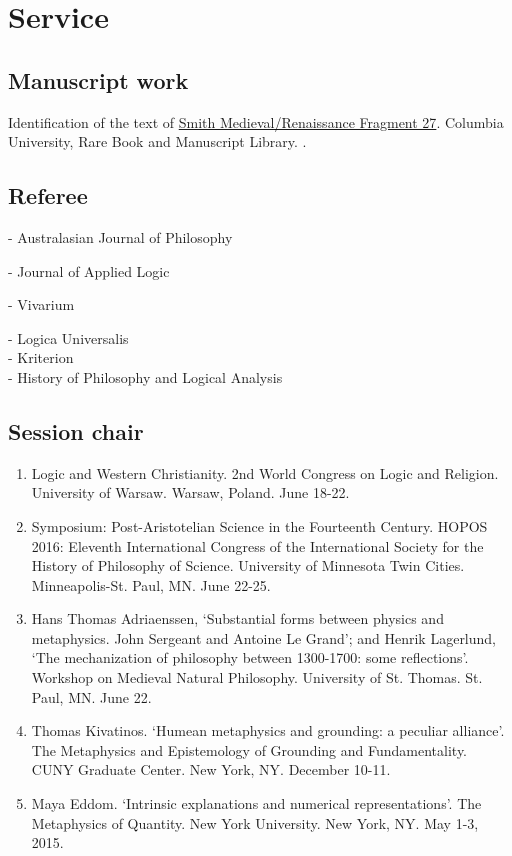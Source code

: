\section{Service}
\subsection{Manuscript work}
Identification of the text of \href{https://digital-scriptorium.org/xtf3/search?rmode=digscript;smode=basic;text=Jacob\%20Archambault;docsPerPage=1;startDoc=1;fullview=yes}{Smith Medieval/Renaissance Fragment 27}. Columbia University, Rare Book and Manuscript Library. .
\subsection{Referee}
\begin{multicols}{2}
- Australasian Journal of Philosophy

- Journal of Applied Logic

- Vivarium

\columnbreak
- Logica Universalis\\
- Kriterion\\
- History of Philosophy and Logical Analysis
\end{multicols}

\subsection{Session chair}
\begin{enumerate}
	\item {}
{}
{Logic and Western Christianity. 2nd World Congress on Logic and Religion. University of Warsaw. Warsaw, Poland. June 18-22.}
{}
\item {}
{}
{Symposium: Post-Aristotelian Science in the Fourteenth Century. HOPOS 2016: Eleventh International Congress of the International Society for the History of Philosophy of Science. University of Minnesota Twin Cities. Minneapolis-St. Paul, MN. June 22-25.}
{}
\item \datedsubsectionnarrow{}
{}
{Hans Thomas Adriaenssen, ‘Substantial forms between physics and metaphysics. John Sergeant and Antoine Le Grand’; and Henrik Lagerlund, ‘The mechanization of philosophy between 1300-1700: some reflections’. Workshop on Medieval Natural Philosophy. University of St. Thomas. St. Paul, MN. June 22.}
{}
\item {}
{}
{Thomas Kivatinos. ‘Humean metaphysics and grounding: a peculiar alliance’. The Metaphysics and Epistemology of Grounding and Fundamentality. CUNY Graduate Center. New York, NY. December 10-11.}
{}
\item \datedsubsectionnarrow{}
{}
{Maya Eddom. ‘Intrinsic explanations and numerical representations’. The Metaphysics of Quantity. New York University. New York, NY. May 1-3, 2015.}
{}
\end{enumerate}

